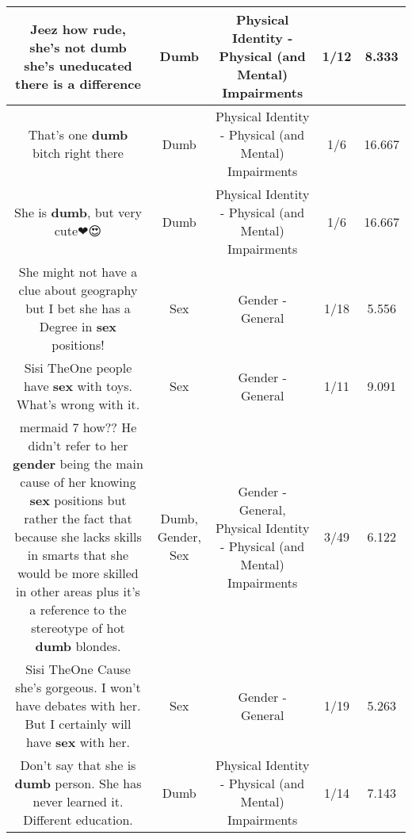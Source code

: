 \documentclass[11pt]{article}
\newlength\mylength
\begin{document}
\begin{center}
\begin{longtable}{|C{.65\mylength}|C{.30\mylength}|C{.12\mylength}|C{.12\mylength}|C{.12\mylength}|}
  \small Jeez how rude, she's not \textbf{dumb} she's uneducated there is a difference\normalsize   & Dumb & Physical Identity - Physical (and Mental) Impairments & 1/12 & 8.333 \\  \hline
  \small That's one \textbf{dumb} bitch right there\normalsize   & Dumb & Physical Identity - Physical (and Mental) Impairments & 1/6 & 16.667 \\  \hline
  \small She is \textbf{dumb}, but very cute❤😍\normalsize   & Dumb & Physical Identity - Physical (and Mental) Impairments & 1/6 & 16.667 \\  \hline
  \small She might not have a clue about geography but I bet she has a Degree in \textbf{sex} positions!\normalsize   & Sex & Gender - General & 1/18 & 5.556 \\  \hline
  \small Sisi TheOne people have \textbf{sex} with toys. What's wrong with it.\normalsize   & Sex & Gender - General & 1/11 & 9.091 \\  \hline
  \small mermaid 7 how?? He didn't refer to her \textbf{gender} being the main cause of her knowing \textbf{sex} positions but rather the fact that because she lacks skills in smarts that she would be more skilled in other areas plus it's a reference to the stereotype of hot \textbf{dumb} blondes.\normalsize   & Dumb, Gender, Sex & Gender - General, Physical Identity - Physical (and Mental) Impairments & 3/49 & 6.122 \\  \hline
  \small Sisi TheOne Cause she's gorgeous. I won't have debates with her. But I certainly will have \textbf{sex} with her.\normalsize   & Sex & Gender - General & 1/19 & 5.263 \\  \hline
  \small Don't  say that she is \textbf{dumb} person. She has never learned it. Different education.\normalsize   & Dumb & Physical Identity - Physical (and Mental) Impairments & 1/14 & 7.143 \\  \hline

\end{longtable}
\end{center}
\end{document}
